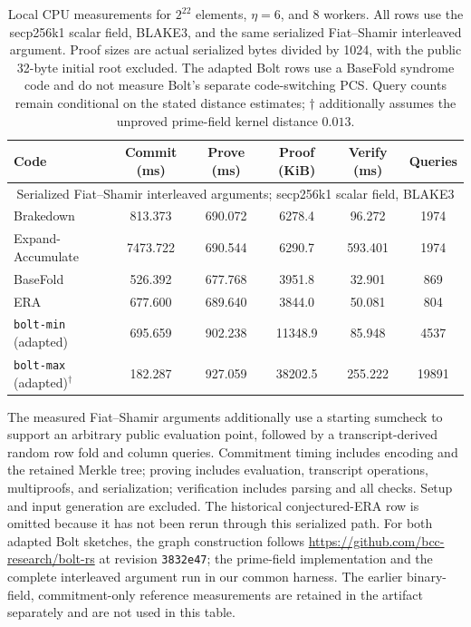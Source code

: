 \begin{table}[htbp]
\centering
\small
\setlength{\tabcolsep}{4pt}
\begin{tabular}{lccccc}
\hline
Code & Commit (ms) & Prove (ms) & Proof (KiB) & Verify (ms) & Queries \\
\hline
\multicolumn{6}{c}{Serialized Fiat--Shamir interleaved arguments; secp256k1 scalar field, BLAKE3} \\
Brakedown & 813.373 & 690.072 & 6278.4 & 96.272 & 1974 \\
Expand-Accumulate & 7473.722 & 690.544 & 6290.7 & 593.401 & 1974 \\
BaseFold & 526.392 & 677.768 & 3951.8 & 32.901 & 869 \\
ERA & 677.600 & 689.640 & 3844.0 & 50.081 & 804 \\
\texttt{bolt-min} (adapted) & 695.659 & 902.238 & 11348.9 & 85.948 & 4537 \\
\texttt{bolt-max} (adapted)$^\dagger$ & 182.287 & 927.059 & 38202.5 & 255.222 & 19891 \\
\hline
\end{tabular}
\caption{Local CPU measurements for $2^{22}$ elements, $\eta=6$, and 8 workers.
All rows use the secp256k1 scalar field, BLAKE3, and the same serialized Fiat--Shamir interleaved argument.
Proof sizes are actual serialized bytes divided by 1024, with the public 32-byte initial root excluded.
The adapted Bolt rows use a BaseFold syndrome code and do not measure Bolt's separate code-switching PCS.
Query counts remain conditional on the stated distance estimates; $\dagger$ additionally assumes the unproved prime-field kernel distance $0.013$.}
\label{tab:iopp-222-eta6}
\end{table}

The measured Fiat--Shamir arguments additionally use a starting sumcheck to support an arbitrary public evaluation point, followed by a transcript-derived random row fold and column queries.
Commitment timing includes encoding and the retained Merkle tree; proving includes evaluation, transcript operations, multiproofs, and serialization; verification includes parsing and all checks.
Setup and input generation are excluded.
The historical conjectured-ERA row is omitted because it has not been rerun through this serialized path.
For both adapted Bolt sketches, the graph construction follows \url{https://github.com/bcc-research/bolt-rs} at revision \texttt{3832e47}; the prime-field implementation and the complete interleaved argument run in our common harness.
The earlier binary-field, commitment-only reference measurements are retained in the artifact separately and are not used in this table.

